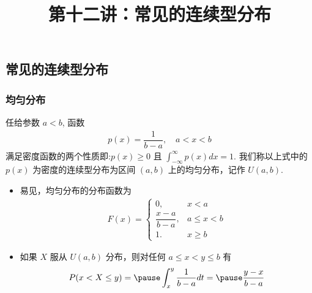 \title[概率论]{第十二讲：常见的连续型分布}

\date{}


{ 
	\begin{frame}
		\titlepage
	\end{frame}
}

\addtocounter{framenumber}{-3}  %
\subsection{常见的连续型分布}
\begin{frame}
	\frametitle{均匀分布}
	\begin{defi}
		任给参数 $a<b$, 函数
		\begin{eqnarray*}
			p(x)=\dfrac{1}{b-a}, \quad a<x<b
		\end{eqnarray*}
		满足密度函数的两个性质即:$p (x)\ge 0$ 且 $\int_{-\infty}^\infty p (x) dx=1$. 我们称以上式中的 $p (x)$ 为密度的连续型分布为区间 $(a,b)$ 上的均匀分布，记作 $U (a,b)$.
	\end{defi}
	\pause

	\begin{itemize}[<+-|alert@+>]
		\item 易见，均匀分布的分布函数为
		      \begin{eqnarray*}
			      F(x)=\left\{
			      \begin{array}{ll}
				      0,                & x<a       \\
				      \dfrac{x-a}{b-a}, & a\leq x<b \\
				      1.                & x\ge b
			      \end{array}
			      \right.
		      \end{eqnarray*}
		\item 如果 $X$ 服从 $U (a,b)$ 分布，则对任何 $a\le x<y\le b$ 有
		      \begin{eqnarray*}
			      P(x<X\le y)=\pause \int_x^y\dfrac{1}{b-a}dt=\pause \dfrac{y-x}{b-a}
		      \end{eqnarray*}

	\end{itemize}

\end{frame}

